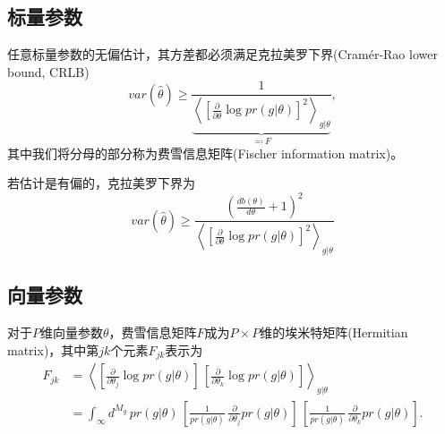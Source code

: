 \subsection{标量参数}
\label{sec:mle-fischer-info-cramer-rao-bound-scalar}
任意标量参数的无偏估计，其方差都必须满足克拉美罗下界(Cramér-Rao lower bound, CRLB)
\begin{equation}
  \label{sec:mle-scalar-crlb-unbiased}
  var \left(\hat{\theta} \right) \ge
  \frac{
  1
  }
  {
  \underbrace{
  \left\langle
  \left[
  \frac{\partial}{\partial \theta}
  \log pr \left(g | \theta \right)
  \right]^{2}
  \right\rangle_{g|\theta}
  }_{\eqqcolon F}
  },
\end{equation}
其中我们将分母的部分称为费雪信息矩阵(Fischer information matrix)。

若估计是有偏的，克拉美罗下界为
\begin{equation}
  \label{sec:mle-scalar-crlb-biased}
  var\left( \hat{\theta} \right) \ge
  \frac{
  \left(
  \frac{d b(\theta)}{d \theta} + 1
  \right)^{2}
  }{
  \left\langle
  \left[
  \frac{\partial}{\partial \theta}
  \log pr \left(g | \theta \right)
  \right]^{2}
  \right\rangle_{g|\theta}
  }
\end{equation}

\subsection{向量参数}
\label{sec:mle-fischer-info-cramer-rao-bound-vector}
对于$P$维向量参数$\theta$，费雪信息矩阵$F$成为$P \times P$维的埃米特矩阵(Hermitian matrix)，其中第$jk$个元素$F_{jk}$表示为
\begin{equation}
  \label{eq:mle-fischer-info-vector-jk}
  \begin{split}
    F_{jk} & =
    \left\langle
    \left[
    \frac{\partial}{\partial \theta_{j}} \log pr \left(g | \theta \right)
    \right] \,
    \left[
    \frac{\partial}{\partial \theta_{k}} \log pr \left(g | \theta \right)
    \right]
    \right\rangle_{g|\theta} \\
    & = \int_{\infty} d^{M_{g}} \, pr \left( g | \theta \right) \,
    \left[
    \frac{1}{pr \left( g | \theta \right)} \,
    \frac{\partial}{\partial \theta_{j}}
    pr \left( g | \theta \right)
    \right] \,
    \left[
    \frac{1}{pr \left( g | \theta \right)} \,
    \frac{\partial}{\partial \theta_{k}}
    pr \left( g | \theta \right)
    \right].
  \end{split}
\end{equation}

